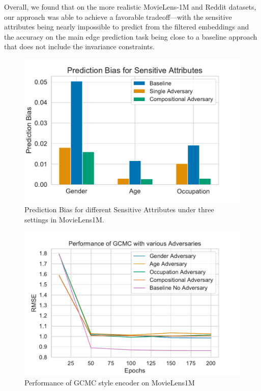 Overall, we found that on the more realistic MovieLens-1M and Reddit datasets, our approach was able to achieve a favorable tradeoff---with the sensitive attributes being nearly impossible to predict from the filtered embeddings and the accuracy on the main edge prediction task being close to a baseline approach that does not include the invariance constraints. 






\begin{figure}
    \centering
    \includegraphics[width=1\linewidth]{icml2019_style/paper/plots/movielens1m_pred_bias.pdf}
    \caption{Prediction Bias for different Sensitive Attributes under three settings in MovieLens1M.}
    \label{fig:pred_bias}
\end{figure}

\begin{figure}
    \centering
    \includegraphics[width=1\linewidth]{icml2019_style/paper/plots/movielens1m_rmse.pdf}
    \caption{Performance of GCMC style encoder on MovieLens1M}
    \label{fig:rmse}
\end{figure}

